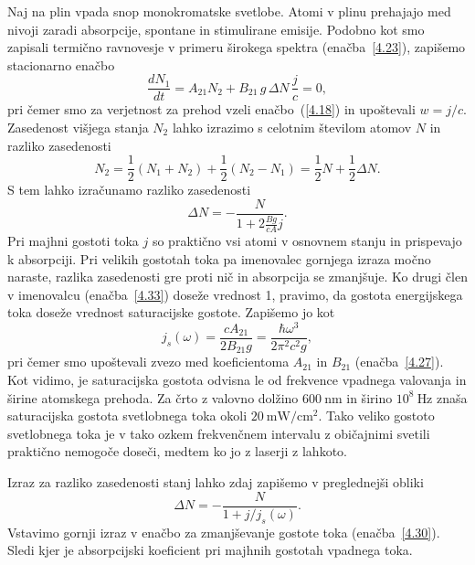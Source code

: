 Naj na plin vpada snop monokromatske svetlobe. 
Atomi v plinu prehajajo med nivoji zaradi absorpcije, spontane in stimulirane emisije. 
Podobno kot smo zapisali termično ravnovesje v primeru
širokega spektra (enačba~\ref{4.23}), zapišemo stacionarno enačbo 
\begin{equation}
\frac{dN_{1}}{dt}=A_{21}N_{2}+B_{21}\,g\,\Delta N\,\frac{j}{c}=0,
\label{4.32}
\end{equation}
pri čemer smo za verjetnost za prehod vzeli
enačbo~(\ref{4.18}) in upoštevali $w=j/c$. Zasedenost višjega stanja $N_{2}$ lahko izrazimo s 
celotnim številom atomov $N$ in razliko zasedenosti 
\begin{equation}
N_{2}=\frac{1}{2}(N_1+N_2) + \frac{1}{2}(N_2-N_1) = \frac{1}{2}N+\frac{1}{2}\Delta N.
\label{4.321}
\end{equation}
S tem lahko izračunamo razliko zasedenosti 
\begin{equation}
\Delta N=-\frac{N}{1+2\frac{Bg}{cA}j}.
\label{4.33}
\end{equation}
Pri majhni gostoti toka $j$ so praktično vsi atomi v osnovnem stanju in prispevajo
k absorpciji. Pri velikih gostotah toka pa imenovalec gornjega
izraza močno naraste, razlika zasedenosti gre proti nič in absorpcija se zmanjšuje.
Ko drugi člen v imenovalcu (enačba~\ref{4.33}) doseže vrednost 1, pravimo, da
gostota energijskega toka doseže vrednost saturacijske gostote.
Zapišemo jo kot 
\begin{equation}
j_{s}(\omega)=\frac{cA_{21}}{2B_{21}g}=
\frac{\hbar\omega^{3}}{2\pi^{2}c^{2}g},
\label{4.34}
\end{equation}
pri čemer smo upoštevali zvezo med koeficientoma $A_{21}$ in $B_{21}$
(enačba~\ref{4.27}).
Kot vidimo, je saturacijska gostota odvisna le od frekvence vpadnega valovanja 
in širine atomskega prehoda. Za črto z valovno dolžino $600~\si{\nano\metre}$ 
in širino $10^{8}~\si{\hertz}$ znaša saturacijska gostota svetlobnega toka okoli 
$20~\si{\milli\watt/\centi\metre^2}$. Tako veliko gostoto svetlobnega toka je v tako ozkem
frekvenčnem intervalu z običajnimi svetili praktično nemogoče doseči, 
medtem ko jo z laserji z lahkoto.

Izraz za razliko zasedenosti stanj lahko zdaj zapišemo v preglednejši obliki
\begin{equation}
\Delta N=-\frac{N}{1+j/j_{s}(\omega)}.
\label{4.35}
\end{equation}
Vstavimo gornji izraz v enačbo za zmanjševanje gostote toka (enačba~\ref{4.30}). Sledi
kjer je 
absorpcijski koeficient pri majhnih gostotah vpadnega toka.

